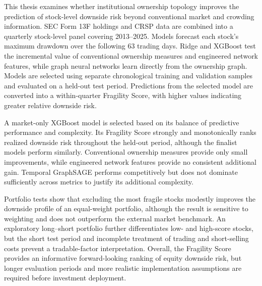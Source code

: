 This thesis examines whether institutional ownership topology improves the prediction of stock-level downside risk beyond conventional market and crowding information. SEC Form 13F holdings and CRSP data are combined into a quarterly stock-level panel covering 2013--2025. Models forecast each stock's maximum drawdown over the following 63 trading days. Ridge and XGBoost test the incremental value of conventional ownership measures and engineered network features, while graph neural networks learn directly from the ownership graph. Models are selected using separate chronological training and validation samples and evaluated on a held-out test period. Predictions from the selected model are converted into a within-quarter Fragility Score, with higher values indicating greater relative downside risk.

A market-only XGBoost model is selected based on its balance of predictive performance and complexity. Its Fragility Score strongly and monotonically ranks realized downside risk throughout the held-out period, although the finalist models perform similarly. Conventional ownership measures provide only small improvements, while engineered network features provide no consistent additional gain. Temporal GraphSAGE performs competitively but does not dominate sufficiently across metrics to justify its additional complexity.

Portfolio tests show that excluding the most fragile stocks modestly improves the downside profile of an equal-weight portfolio, although the result is sensitive to weighting and does not outperform the external market benchmark. An exploratory long--short portfolio further differentiates low- and high-score stocks, but the short test period and incomplete treatment of trading and short-selling costs prevent a tradable-factor interpretation. Overall, the Fragility Score provides an informative forward-looking ranking of equity downside risk, but longer evaluation periods and more realistic implementation assumptions are required before investment deployment.